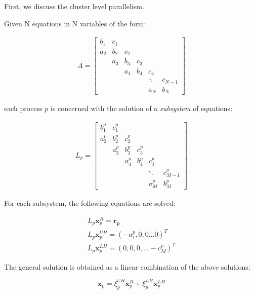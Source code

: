 \documentclass{article}
\begin{document}
    First, we discuss the cluster level parallelism.

    Given N equations in N variables of the form:

    \begin{align}
    & A =
     \begin{bmatrix}
         b_1 & c_1 \\
         a_2 & b_2 & c_2 \\
             & a_3 & b_3 & c_3 \\
             &     & a_4 & b_4 & c_4 \\
             &     &     &     &  \ddots & c_{N-1}\\
             &     &     &     &     a_N  & b_N
      \end{bmatrix}&
    \end{align}

    each process $p$ is concerned with the solution of a \emph{subsystem}
    of equations:

    \begin{align}
    &L_p =
    \begin{bmatrix}
        b_1^p & c_1^p \\
        a_2^p & b_2^p & c_2^p \\
              & a_3^p & b_3^p & c_3^p \\
              &       & a_4^p & b_4^p & c_4^p \\
              &       &       &       &  \ddots & c_{M-1}^p\\
              &       &       &       &     a_{M}^p  & b_{M}^p
     \end{bmatrix}&
    \end{align}

    For each subsystem, the following equations are solved:

    \begin{align}
        & L_p\boldsymbol{x}_p^R = \boldsymbol{r_p} &  \label{eqn:local-eqn-1} \\
        & L_p\boldsymbol{x}_p^{UH} = (-a_1^p, 0, 0 \hdots 0)^T &  \label{eqn:local-eqn-2} \\
        & L_p\boldsymbol{x}_p^{LH} = (0, 0, 0, \hdots -c_M^p)^T \label{eqn:local-eqn-3} &
    \end{align}

    The general solution is obtained as a linear combination of the above solutions:

    \begin{equation} \label{eqn:linear-combo}
        \boldsymbol{x}_p = {\xi}_p^{UH} \boldsymbol{x}_p^R + {\xi}_p^{LH} \boldsymbol{x}_p^{LH}
    \end{equation}
\end{document}
